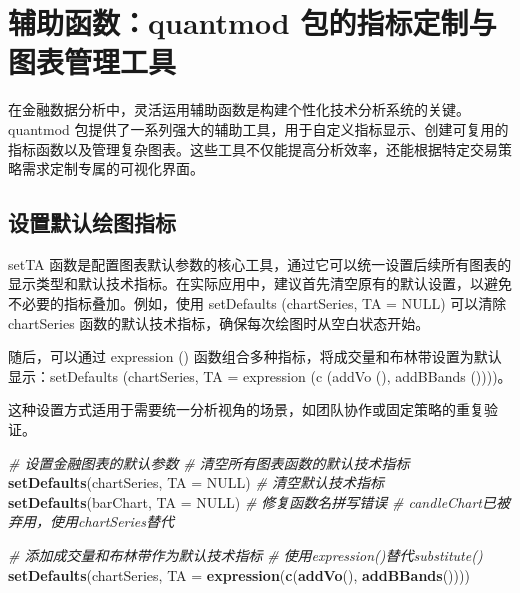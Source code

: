 \documentclass[]{ctexbook}
\newenvironment{Shaded}{\begin{snugshade}}{\end{snugshade}}
\newcommand{\AttributeTok}[1]{\textcolor[rgb]{0.13,0.29,0.53}{#1}}
\newcommand{\CommentTok}[1]{\textcolor[rgb]{0.56,0.35,0.01}{\textit{#1}}}
\newcommand{\ConstantTok}[1]{\textcolor[rgb]{0.56,0.35,0.01}{#1}}
\newcommand{\FunctionTok}[1]{\textcolor[rgb]{0.13,0.29,0.53}{\textbf{#1}}}
\newcommand{\NormalTok}[1]{#1}
\begin{document}
\section{辅助函数：quantmod 包的指标定制与图表管理工具}\label{ux8f85ux52a9ux51fdux6570quantmod-ux5305ux7684ux6307ux6807ux5b9aux5236ux4e0eux56feux8868ux7ba1ux7406ux5de5ux5177}

在金融数据分析中，灵活运用辅助函数是构建个性化技术分析系统的关键。quantmod 包提供了一系列强大的辅助工具，用于自定义指标显示、创建可复用的指标函数以及管理复杂图表。这些工具不仅能提高分析效率，还能根据特定交易策略需求定制专属的可视化界面。

\subsection{设置默认绘图指标}\label{ux8bbeux7f6eux9ed8ux8ba4ux7ed8ux56feux6307ux6807}

setTA 函数是配置图表默认参数的核心工具，通过它可以统一设置后续所有图表的显示类型和默认技术指标。在实际应用中，建议首先清空原有的默认设置，以避免不必要的指标叠加。例如，使用 setDefaults (chartSeries, TA = NULL) 可以清除 chartSeries 函数的默认技术指标，确保每次绘图时从空白状态开始。

随后，可以通过 expression () 函数组合多种指标，将成交量和布林带设置为默认显示：setDefaults (chartSeries, TA = expression (c (addVo (), addBBands ())))。

这种设置方式适用于需要统一分析视角的场景，如团队协作或固定策略的重复验证。

\begin{Shaded}
\begin{Highlighting}[]
\CommentTok{\# 设置金融图表的默认参数}
\CommentTok{\# 清空所有图表函数的默认技术指标}
\FunctionTok{setDefaults}\NormalTok{(chartSeries, }\AttributeTok{TA =} \ConstantTok{NULL}\NormalTok{)  }\CommentTok{\# 清空默认技术指标}
\FunctionTok{setDefaults}\NormalTok{(barChart, }\AttributeTok{TA =} \ConstantTok{NULL}\NormalTok{)     }\CommentTok{\# 修复函数名拼写错误}
\CommentTok{\# candleChart已被弃用，使用chartSeries替代}

\CommentTok{\# 添加成交量和布林带作为默认技术指标}
\CommentTok{\# 使用expression()替代substitute()}
\FunctionTok{setDefaults}\NormalTok{(chartSeries, }\AttributeTok{TA =} \FunctionTok{expression}\NormalTok{(}\FunctionTok{c}\NormalTok{(}\FunctionTok{addVo}\NormalTok{(), }\FunctionTok{addBBands}\NormalTok{())))}
\end{Highlighting}
\end{Shaded}
\end{document}
